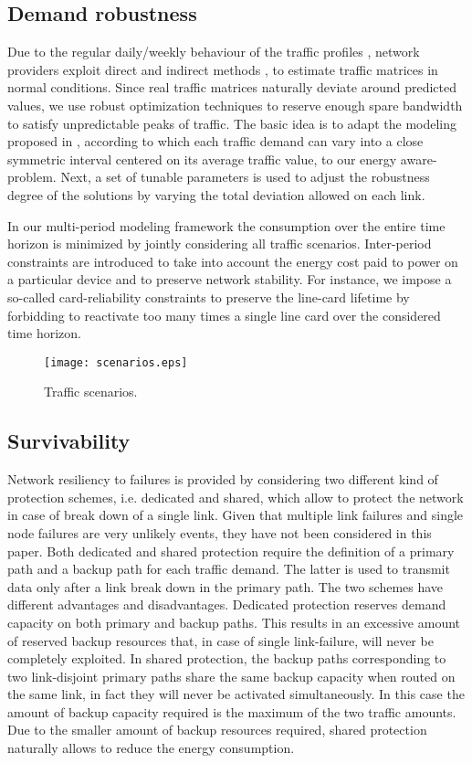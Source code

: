 \documentclass[final,5p,times,twocolumn]{elsarticle}
\begin{document}
\subsection{Demand robustness}
Due to the regular daily/weekly behaviour of the traffic profiles \cite{Geant}, network providers exploit direct \cite{netflow12} and indirect methods \cite{casas09}, to estimate traffic matrices in normal conditions. Since real traffic matrices naturally deviate around predicted values, we use robust optimization techniques to reserve enough spare bandwidth to satisfy unpredictable peaks of traffic. The basic idea is to adapt the modeling proposed  in \cite{bertsimas11}, according to which each traffic demand can vary into a close symmetric interval centered on its average traffic value, to our energy aware-problem. Next, a set of tunable parameters is used to adjust the robustness degree of the solutions by varying the total deviation allowed on each link.
 



In our multi-period modeling framework the consumption over the entire time horizon is minimized by jointly considering all traffic scenarios. Inter-period constraints are introduced to take into account the energy cost paid to power on a particular device and to preserve network stability. For instance, we impose a so-called card-reliability constraints to preserve the line-card lifetime by forbidding to reactivate too many times a single line card over the considered time horizon.


\begin{figure}[t]\centering
  \texttt{[image: scenarios.eps]}
  \caption{Traffic scenarios.}
\label{fig:scenario}
\end{figure}

\subsection{Survivability}


Network resiliency to failures is provided by considering two different kind of protection schemes, i.e. dedicated and shared, which allow to protect the network in case of break down of a single link.  Given that multiple link failures and single node failures are very unlikely events, they have not been considered in this paper. Both dedicated and shared protection require the definition of a primary path and a backup path for each traffic demand. The latter is used to transmit data only after a link break down in the primary path. The two schemes have different advantages and disadvantages. Dedicated protection  reserves demand capacity on both primary and backup paths. This results in an excessive amount of reserved backup resources that, in case of single link-failure, will never be completely exploited. In shared protection, the backup paths corresponding to two link-disjoint primary paths share the same backup capacity when routed on the same link, in fact they will never be activated simultaneously. In this case the amount of backup capacity required is the maximum of the two traffic amounts. Due to the smaller amount of backup resources required, shared protection naturally allows to reduce the energy consumption. 
\end{document}
